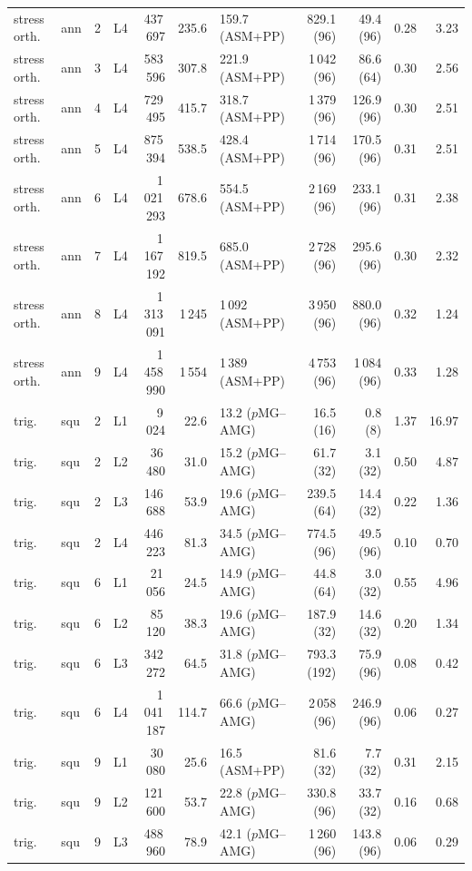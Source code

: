 \begin{tabular}{llrrrrlrrrr}
stress orth. & ann & 2 & L4 & 437\,697 & 235.6 & 159.7 (ASM+PP) & 829.1 (96) & 49.4 (96) & 0.28 & 3.23\\
stress orth. & ann & 3 & L4 & 583\,596 & 307.8 & 221.9 (ASM+PP) & 1\,042 (96) & 86.6 (64) & 0.30 & 2.56\\
stress orth. & ann & 4 & L4 & 729\,495 & 415.7 & 318.7 (ASM+PP) & 1\,379 (96) & 126.9 (96) & 0.30 & 2.51\\
stress orth. & ann & 5 & L4 & 875\,394 & 538.5 & 428.4 (ASM+PP) & 1\,714 (96) & 170.5 (96) & 0.31 & 2.51\\
stress orth. & ann & 6 & L4 & 1\,021\,293 & 678.6 & 554.5 (ASM+PP) & 2\,169 (96) & 233.1 (96) & 0.31 & 2.38\\
stress orth. & ann & 7 & L4 & 1\,167\,192 & 819.5 & 685.0 (ASM+PP) & 2\,728 (96) & 295.6 (96) & 0.30 & 2.32\\
stress orth. & ann & 8 & L4 & 1\,313\,091 & 1\,245 & 1\,092 (ASM+PP) & 3\,950 (96) & 880.0 (96) & 0.32 & 1.24\\
stress orth. & ann & 9 & L4 & 1\,458\,990 & 1\,554 & 1\,389 (ASM+PP) & 4\,753 (96) & 1\,084 (96) & 0.33 & 1.28\\
trig. & squ & 2 & L1 & 9\,024 & 22.6 & 13.2 ($p$MG--AMG) & 16.5 (16) & 0.8 (8) & 1.37 & 16.97\\
trig. & squ & 2 & L2 & 36\,480 & 31.0 & 15.2 ($p$MG--AMG) & 61.7 (32) & 3.1 (32) & 0.50 & 4.87\\
trig. & squ & 2 & L3 & 146\,688 & 53.9 & 19.6 ($p$MG--AMG) & 239.5 (64) & 14.4 (32) & 0.22 & 1.36\\
trig. & squ & 2 & L4 & 446\,223 & 81.3 & 34.5 ($p$MG--AMG) & 774.5 (96) & 49.5 (96) & 0.10 & 0.70\\
trig. & squ & 6 & L1 & 21\,056 & 24.5 & 14.9 ($p$MG--AMG) & 44.8 (64) & 3.0 (32) & 0.55 & 4.96\\
trig. & squ & 6 & L2 & 85\,120 & 38.3 & 19.6 ($p$MG--AMG) & 187.9 (32) & 14.6 (32) & 0.20 & 1.34\\
trig. & squ & 6 & L3 & 342\,272 & 64.5 & 31.8 ($p$MG--AMG) & 793.3 (192) & 75.9 (96) & 0.08 & 0.42\\
trig. & squ & 6 & L4 & 1\,041\,187 & 114.7 & 66.6 ($p$MG--AMG) & 2\,058 (96) & 246.9 (96) & 0.06 & 0.27\\
trig. & squ & 9 & L1 & 30\,080 & 25.6 & 16.5 (ASM+PP) & 81.6 (32) & 7.7 (32) & 0.31 & 2.15\\
trig. & squ & 9 & L2 & 121\,600 & 53.7 & 22.8 ($p$MG--AMG) & 330.8 (96) & 33.7 (32) & 0.16 & 0.68\\
trig. & squ & 9 & L3 & 488\,960 & 78.9 & 42.1 ($p$MG--AMG) & 1\,260 (96) & 143.8 (96) & 0.06 & 0.29\\

\end{tabular}
